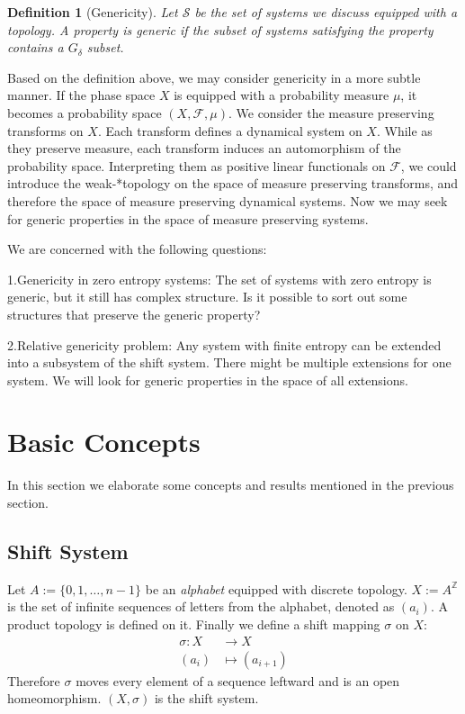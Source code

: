 \documentclass{article}
\newtheorem{definition}{Definition}
\begin{document}
\begin{CJK}{UTF8}{gbsn}
\begin{definition}[Genericity]
	 Let $\mathscr{S}$ be the set of systems we discuss equipped with a topology. A property is generic if the subset of systems satisfying the property contains a $G_\delta$ subset.
\end{definition}

Based on the definition above, we may consider genericity in a more subtle manner. If the phase space $X$ is equipped with a probability measure $\mu$, it becomes a probability space $(X,\mathscr{F},\mu)$. We consider the measure preserving transforms on $X$. Each transform defines a dynamical system on $X$. While as they preserve measure, each transform induces an automorphism of the probability space. Interpreting them as positive linear functionals on  $\mathscr{F}$, we could introduce the weak-*topology on the space of measure preserving transforms, and therefore  the space of measure preserving dynamical systems. Now we may seek for generic properties in the space of measure preserving systems. 

\vspace{3ex}

We are concerned with the following questions:

1.Genericity in zero entropy systems: The set of systems with zero entropy is generic, but it still has complex structure. Is it possible to sort out some structures that preserve the generic property?

2.Relative genericity problem: Any system with finite entropy can be extended into a subsystem of the shift system. There might be multiple extensions for one system. We will look for generic properties in the space of all extensions.


\section{Basic Concepts}
In this section we elaborate some concepts and results mentioned in the previous section.
\subsection{Shift System}

Let $A:=\{0,1,\dots ,n-1\}$ be an \textit{alphabet} equipped with discrete topology. $X:=A^\mathbb{Z}$ is the set of infinite sequences of letters from the alphabet, denoted as $(a_i)$. A product topology is defined on it. Finally we define a shift mapping $\sigma$ on $X$:
\begin{align*}
	\sigma:X&\rightarrow X \\
	(a_i)&\mapsto(a_{i+1})
\end{align*}
Therefore $\sigma$ moves every element of a sequence leftward and is an open homeomorphism.
$(X,\sigma)$ is the shift system.


\end{CJK}
\end{document}
